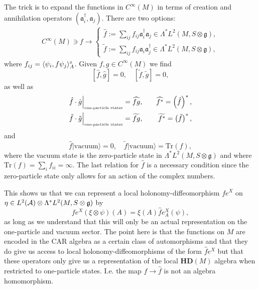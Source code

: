\documentclass[12pt]{article}
\newcommand{\nn}{\nonumber}
\def\ca{{\cal A}}
\begin{document}
The trick is to expand the functions in $C^\infty(M)$ in terms of creation and annihilation operators $( \mathfrak{a}^\dagger_i ,\mathfrak{a}_j)$. There are two options:
\begin{eqnarray}
C^\infty(M) \ni f \longrightarrow \left\{
\begin{array}{l}
 \hat{f}:= \sum_{ij}  f_{ij}  \mathfrak{a}^\dagger_i \mathfrak{a}_j \in \Lambda^*  L^2(M,S\otimes \mathfrak{g}),
\\ 
 \tilde{f}:= \sum_{ij}  f_{ij}  \mathfrak{a}_i \mathfrak{a}^\dagger_j \in \Lambda^*  L^2(M,S\otimes \mathfrak{g}),
\end{array}\right.
\end{eqnarray}
where $f_{ij}= \langle \psi_i  , f \psi_j\rangle_{A}^{\mbox{\tiny S}} $. Given $f,g\in C^\infty(M)$ we find 
$$
[\hat{f}, \hat{g}]=0,  \quad [\tilde{f}, \tilde{g}]=0,  
$$
as well as 
\begin{eqnarray}
\hat{f} \cdot\hat{g}\Big\vert_{\mbox{\tiny one-particle states}} = \widehat{fg}, &&\quad \widehat{f^*} = \left(\hat{f}\right)^*,
\nn\\
\tilde{f} \cdot\tilde{g}\Big\vert_{\mbox{\tiny one-particle states}} = \widetilde{fg}, &&\quad \widetilde{f^*} = \left(\tilde{f}\right)^*,
\end{eqnarray}
and
$$
\hat{f} \vert \mbox{vacuum}\rangle =0, \quad \tilde{f} \vert \mbox{vacuum}\rangle =\mbox{Tr}(f),
$$
where the vacuum state is the zero-particle state in $\Lambda^*L^2(M,S\otimes\mathfrak{g})$ and where $\mbox{Tr}(f)= \sum_i f_{ii}=\infty$. The last relation for $\hat{f}$ is a necessary condition since the zero-particle state only allows for an action of the complex numbers.

This shows us that we can represent a local holonomy-diffeomorphism $f e^X$ on $\eta\in L^2 (\ca)\otimes \Lambda^*  L^2(M,S\otimes \mathfrak{g})$ by 
\begin{equation}
f e^X(\xi\otimes\psi)(A)= \xi(A)\hat{f}e^X_A(\psi),
\label{actbundle2}
\end{equation}
as long as we understand that this will only be an actual representation on the one-particle and vacuum sector.
The point here is that the functions on $M$ are encoded in the CAR algebra as a certain class of automorphisms and that they do give us access to local holonomy-diffeomorphisms of the form
$
\hat{f} e^{X} %
$
but that these operators only give us a representation of the local $\mathbf{HD}(M)$ algebra when restricted to one-particle states. I.e. the map $f\rightarrow \hat{f}$ is not an algebra homomorphism.
\end{document}
